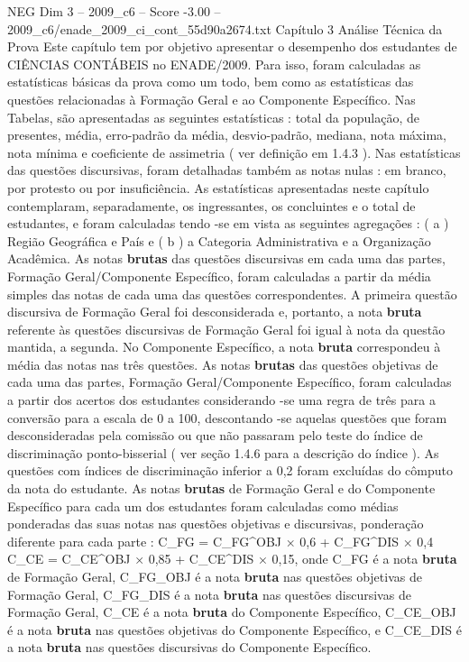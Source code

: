 \begin{textsample}{NEG Dim 3 – 2009\_c6 – Score -3.00 – 2009\_c6/enade\_2009\_ci\_cont\_55d90a2674.txt}  \label{ex:f3_neg_045}
Capítulo 3 Análise Técnica da Prova Este capítulo tem por objetivo apresentar o desempenho dos estudantes de CIÊNCIAS CONTÁBEIS no ENADE/2009.
Para isso, foram calculadas as estatísticas básicas da prova como um todo, bem como as estatísticas das questões relacionadas à Formação Geral e ao Componente Específico.
Nas Tabelas, são apresentadas as seguintes estatísticas : total da população, de presentes, média, erro-padrão da média, desvio-padrão, mediana, nota máxima, nota mínima e coeficiente de assimetria ( ver definição em 1.4.3 ).
Nas estatísticas das questões discursivas, foram detalhadas também as notas nulas : em branco, por protesto ou por insuficiência.
As estatísticas apresentadas neste capítulo contemplaram, separadamente, os ingressantes, os concluintes e o total de estudantes, e foram calculadas tendo -se em vista as seguintes agregações : ( a ) Região Geográfica e País e ( b ) a Categoria Administrativa e a Organização Acadêmica.
As notas \textbf{brutas} das questões discursivas em cada uma das partes, Formação Geral/Componente Específico, foram calculadas a partir da média simples das notas de cada uma das questões correspondentes.
A primeira questão discursiva de Formação Geral foi desconsiderada e, portanto, a nota \textbf{bruta} referente às questões discursivas de Formação Geral foi igual à nota da questão mantida, a segunda.
No Componente Específico, a nota \textbf{bruta} correspondeu à média das notas nas três questões.
As notas \textbf{brutas} das questões objetivas de cada uma das partes, Formação Geral/Componente Específico, foram calculadas a partir dos acertos dos estudantes considerando -se uma regra de três para a conversão para a escala de 0 a 100, descontando -se aquelas questões que foram desconsideradas pela comissão ou que não passaram pelo teste do índice de discriminação ponto-bisserial ( ver seção 1.4.6 para a descrição do índice ).
As questões com índices de discriminação inferior a 0,2 foram excluídas do cômputo da nota do estudante.
As notas \textbf{brutas} de Formação Geral e do Componente Específico para cada um dos estudantes foram calculadas como médias ponderadas das suas notas nas questões objetivas e discursivas, ponderação diferente para cada parte : C\_FG = C\_FG\textasciicircum{}OBJ × 0,6 + C\_FG\textasciicircum{}DIS × 0,4 C\_CE = C\_CE\textasciicircum{}OBJ × 0,85 + C\_CE\textasciicircum{}DIS × 0,15, onde C\_FG é a nota \textbf{bruta} de Formação Geral, C\_FG\_OBJ é a nota \textbf{bruta} nas questões objetivas de Formação Geral, C\_FG\_DIS é a nota \textbf{bruta} nas questões discursivas de Formação Geral, C\_CE é a nota \textbf{bruta} do Componente Específico, C\_CE\_OBJ é a nota \textbf{bruta} nas questões objetivas do Componente Específico, e C\_CE\_DIS é a nota \textbf{bruta} nas questões discursivas do Componente Específico.

\end{textsample}
